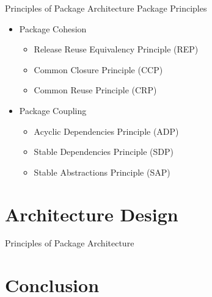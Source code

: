 \documentclass[xcolor=svgnames]{beamer}
\begin{document}

\begin{frame}{Principles of Package Architecture}
    Package Principles
    \begin{itemize}
        \item<2-> Package Cohesion
            \begin{itemize}
                \item<4-> Release Reuse Equivalency Principle (REP)
                \item<5-> Common Closure Principle (CCP)
                \item<6-> Common Reuse Principle (CRP)
            \end{itemize}
        \item<3-> Package Coupling
            \begin{itemize}
                \item<7-> Acyclic Dependencies Principle (ADP)
                \item<8-> Stable Dependencies Principle (SDP)
                \item<9-> Stable Abstractions Principle (SAP)
            \end{itemize}
    \end{itemize}
\end{frame}


\begin{frame}{\subsecname}
\end{frame}


\section{Architecture Design}


\begin{frame}{Principles of Package Architecture}
\end{frame}


\section{Conclusion}
\end{document}
